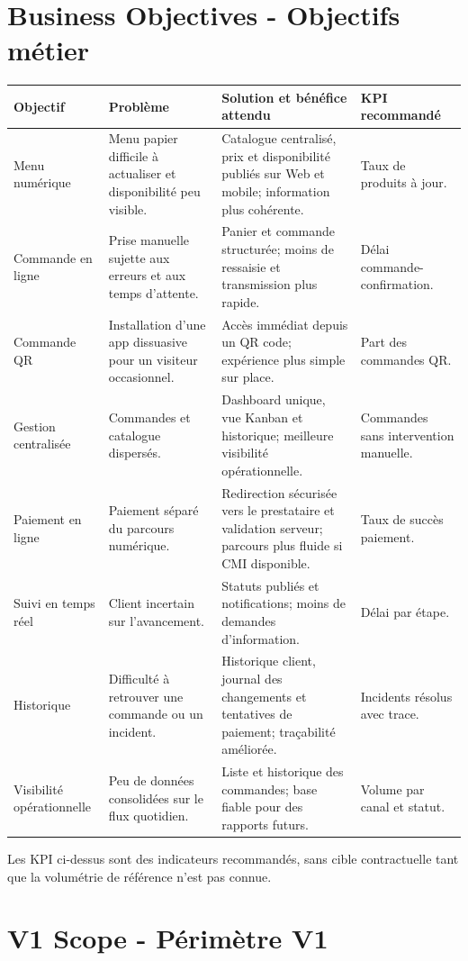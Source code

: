 \documentclass[10pt,a4paper]{article}
\begin{document}
\section{Business Objectives - Objectifs métier}
\begin{longtable}{@{}L{3.2cm}L{5.1cm}L{5.1cm}L{2.1cm}@{}}
\toprule
\textbf{Objectif} & \textbf{Problème} & \textbf{Solution et bénéfice attendu} & \textbf{KPI recommandé} \\
\midrule
\endhead
Menu numérique & Menu papier difficile à actualiser et disponibilité peu visible. & Catalogue centralisé, prix et disponibilité publiés sur Web et mobile; information plus cohérente. & Taux de produits à jour. \\
Commande en ligne & Prise manuelle sujette aux erreurs et aux temps d'attente. & Panier et commande structurée; moins de ressaisie et transmission plus rapide. & Délai commande-confirmation. \\
Commande QR & Installation d'une app dissuasive pour un visiteur occasionnel. & Accès immédiat depuis un QR code; expérience plus simple sur place. & Part des commandes QR. \\
Gestion centralisée & Commandes et catalogue dispersés. & Dashboard unique, vue Kanban et historique; meilleure visibilité opérationnelle. & Commandes sans intervention manuelle. \\
Paiement en ligne & Paiement séparé du parcours numérique. & Redirection sécurisée vers le prestataire et validation serveur; parcours plus fluide si CMI disponible. & Taux de succès paiement. \\
Suivi en temps réel & Client incertain sur l'avancement. & Statuts publiés et notifications; moins de demandes d'information. & Délai par étape. \\
Historique & Difficulté à retrouver une commande ou un incident. & Historique client, journal des changements et tentatives de paiement; traçabilité améliorée. & Incidents résolus avec trace. \\
Visibilité opérationnelle & Peu de données consolidées sur le flux quotidien. & Liste et historique des commandes; base fiable pour des rapports futurs. & Volume par canal et statut. \\
\bottomrule
\end{longtable}
Les KPI ci-dessus sont des indicateurs recommandés, sans cible contractuelle tant que la volumétrie de référence n'est pas connue.

\section{V1 Scope - Périmètre V1}
\end{document}
